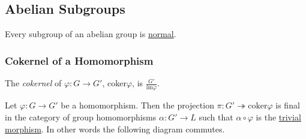 \subsection{Abelian Subgroups}\label{abeliansubgroups}

Every subgroup of an abelian group is \hyperref[normalsubgroup]{normal}.

\subsubsection{Cokernel of a Homomorphism}
The \emph{cokernel} of $\varphi : G \rightarrow G'$, coker$\varphi$, is $\frac{G'}{\textrm{im} \varphi}$.

\begin{proposition}
Let $\varphi : G \rightarrow G'$ be a homomorphism. Then the projection $\pi : G' \twoheadrightarrow \textrm{coker}\varphi $
is final in the category of group homomorphisms $\alpha : G' \rightarrow L$ such that $\alpha \circ \varphi$ is the
\hyperref[trivialmorphism]{trivial morphism}. In other words the following diagram commutes.
\begin{figure}[H]
\centering

\end{figure}
\end{proposition}